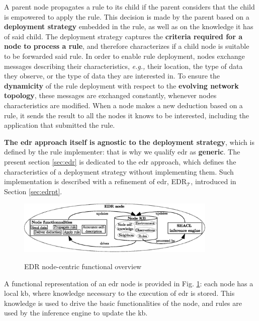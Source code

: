 \documentclass[sw]{iosart2x}
\newcommand{\edrt}{EDR$_{\mathcal{T}}$\xspace}
\begin{document}
A parent node propagates a rule to its child if the parent considers that the child is empowered to apply the rule.
This decision is made by the parent based on a \textbf{deployment strategy} embedded in the rule, as well as on the knowledge it has of said child.
The deployment strategy captures the \textbf{criteria required for a node to process a rule}, and therefore characterizes if a child node is suitable to be forwarded said rule.
In order to enable rule deployment, nodes exchange messages describing their characteristics, \textit{e.g.,} their location, the type of data they observe, or the type of data they are interested in.
To ensure the \textbf{dynamicity} of the rule deployment with respect to the \textbf{evolving network topology}, these messages are exchanged constantly, whenever nodes characteristics are modified.
When a node makes a new deduction based on a rule, it sends the result to all the nodes it knows to be interested, including the application that submitted the rule.

\textbf{The \gls{edr} approach itself is agnostic to the deployment strategy}, which is defined by the rule implementer: that is why we qualify \gls{edr} as \textbf{generic}. 
The present section \textsection \ref{sec:edr} is dedicated to the \gls{edr} approach, which defines the characteristics of a deployment strategy without implementing them.
Such implementation is described with a refinement of \gls{edr}, \edrt, introduced in Section \textsection \ref{sec:edrpt}.

\begin{figure}
	\centering
	\caption{EDR node-centric functional overview}
	\includegraphics[width=0.85\textwidth]{figures/overview.eps}
	\label{fig:node_overview}
\end{figure}

A functional representation of an \gls{edr} node is provided in Fig. \ref{fig:node_overview}: each node has a local \gls{kb}, where knowledge necessary to the execution of \gls{edr} is stored.
This knowledge is used to drive the basic functionalities of the node, and rules are used by the inference engine to update the \gls{kb}.
\end{document}

